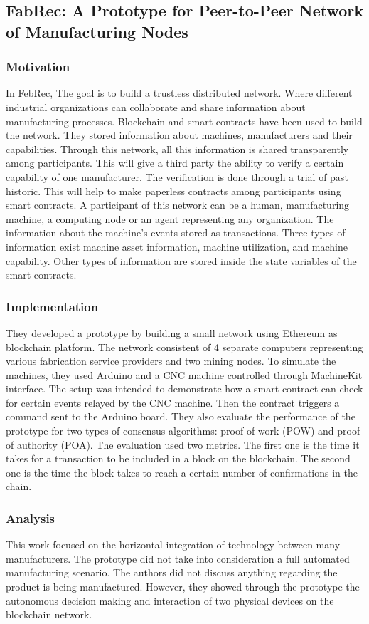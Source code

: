 \documentclass[runningheads]{llncs}
\begin{document}
\newpage

\subsection{FabRec: A Prototype for Peer-to-Peer Network of Manufacturing Nodes \cite{Angrish2018a}}
\subsubsection{Motivation}
In FebRec, The goal is to build a trustless distributed network. Where different industrial organizations can collaborate and share information about manufacturing processes. Blockchain and smart contracts have been used to build the network. They stored information about machines, manufacturers and their capabilities. Through this network, all this information is shared transparently among participants. This will give a third party the ability to verify a certain capability of one manufacturer. The verification is done through a trial of past historic. This will help to make paperless contracts among participants using smart contracts. A participant of this network can be a human, manufacturing machine, a computing node or an agent representing any organization. The information about the machine's events stored as transactions. Three types of information exist machine asset information, machine utilization, and machine capability. Other types of information are stored inside the state variables of the smart contracts.
\subsubsection{Implementation}
They developed a prototype by building a small network using Ethereum as blockchain platform. The network consistent of 4 separate computers representing various fabrication service providers and two mining nodes. To simulate the machines, they used Arduino and a CNC machine controlled through MachineKit interface. The setup was intended to demonstrate how a smart contract can check for certain events relayed by the CNC machine. Then the contract triggers a command sent to the Arduino board. They also evaluate the performance of the prototype for two types of consensus algorithms: proof of work (POW) and proof of authority (POA). The evaluation used two metrics. The first one is the time it takes for a transaction to be included in a block on the blockchain. The second one is the time the block takes to reach a certain number of confirmations in the chain.
\subsubsection{Analysis}
This work focused on the horizontal integration of technology between many manufacturers. The prototype did not take into consideration a full automated manufacturing scenario. The authors did not discuss anything regarding the product is being manufactured.  However, they showed through the prototype the autonomous decision making and interaction of two physical devices on the blockchain network.  
\end{document}

